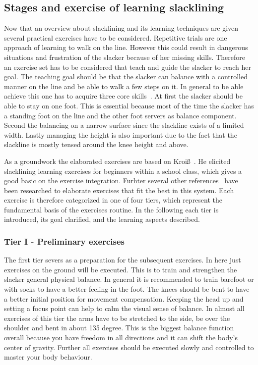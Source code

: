 \subsection{Stages and exercise of learning slacklining}\label{3_3_2_StagesExercises}
Now that an overview about slacklining and its learning techniques are given several practical exercises have to be considered. Repetitive trials are one approach of learning to walk on the line. However this could result in dangerous situations and frustration of the slacker because of her missing skills. Therefore an exercise set has to be considered that teach and guide the slacker to reach her goal. The teaching goal should be that the slacker can balance with a controlled manner on the line and be able to walk a few steps on it. In general to be able achieve this one has to acquire three core skills~\cite{Kroiss2007-ab}. At first the slacker should be able to stay on one foot. This is essential because most of the time the slacker has a standing foot on the line and the other foot servers as balance component. Second the balancing on a narrow surface since the slackline exists of a limited width. Lastly managing the height is also important due to the fact that the slackline is mostly tensed around the knee height and above.

As a groundwork the elaborated exercises are based on Kroiß~\cite{Kroiss2007-ab}. He elicited slacklining learning exercises for beginners within a school class, which gives a good basic on the exercise integration. Furhter several other references~\cite{Balcom2005-wl, Donath2013-kk, Donath2016-gm, Granacher2010-ow, Keller2012-xh, Kleindl2011-bl, Pfusterschmied2013-yy, Thomann2013-aa} have been researched to elaborate exercises that fit the best in this system. Each exercise is therefore categorized in one of four tiers, which represent the fundamental basis of the exercises routine. In the following each tier is introduced, its goal clarified, and the learning aspects described.

\subsubsection{Tier I - Preliminary exercises}
The first tier severs as a preparation for the subsequent exercises. In here just exercises on the ground will be executed. This is to train and strengthen the slacker general physical balance. In general it is recommended to train barefoot or with socks to have a better feeling in the foot. The knees should be bent to have a better initial position for movement compensation. Keeping the head up and setting a focus point can help to calm the visual sense of balance. In almost all exercises of this tier the arms have to be stretched to the side, be over the shoulder and bent in about 135 degree. This is the biggest balance function overall because you have freedom in all directions and it can shift the body's center of gravity. Further all exercises should be executed slowly and controlled to master your body behaviour.

